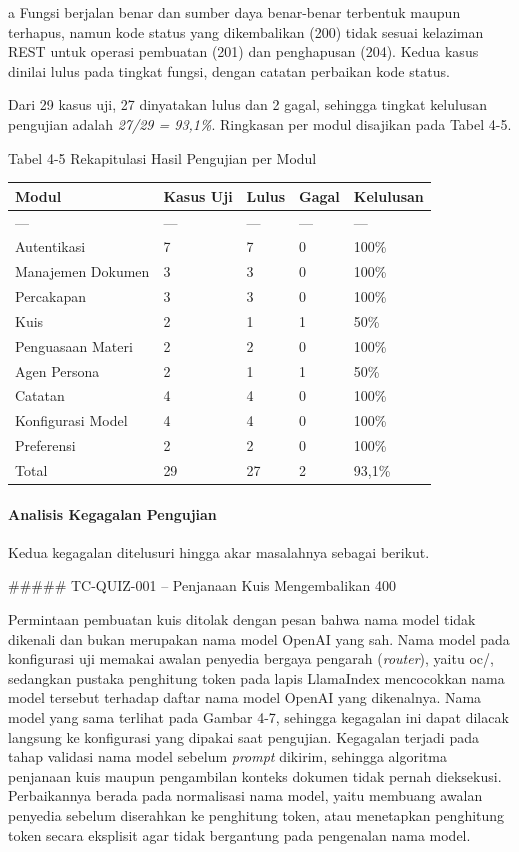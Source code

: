 \documentclass[12pt,a4paper]{article}
\begin{document}
a Fungsi berjalan benar dan sumber daya benar-benar terbentuk maupun terhapus, namun kode status yang dikembalikan (200) tidak sesuai kelaziman REST untuk operasi pembuatan (201) dan penghapusan (204). Kedua kasus dinilai lulus pada tingkat fungsi, dengan catatan perbaikan kode status.

Dari 29 kasus uji, 27 dinyatakan lulus dan 2 gagal, sehingga tingkat kelulusan pengujian adalah \textit{27/29 = 93,1\%}. Ringkasan per modul disajikan pada Tabel 4-5.

Tabel 4-5	Rekapitulasi Hasil Pengujian per Modul

\begin{table}[h]
\centering
\begin{tabular}{lllll}
\toprule
Modul & Kasus Uji & Lulus & Gagal & Kelulusan \\
\midrule
--- & --- & --- & --- & --- \\
Autentikasi & 7 & 7 & 0 & 100\% \\
Manajemen Dokumen & 3 & 3 & 0 & 100\% \\
Percakapan & 3 & 3 & 0 & 100\% \\
Kuis & 2 & 1 & 1 & 50\% \\
Penguasaan Materi & 2 & 2 & 0 & 100\% \\
Agen Persona & 2 & 1 & 1 & 50\% \\
Catatan & 4 & 4 & 0 & 100\% \\
Konfigurasi Model & 4 & 4 & 0 & 100\% \\
Preferensi & 2 & 2 & 0 & 100\% \\
Total & 29 & 27 & 2 & 93,1\% \\
\bottomrule
\end{tabular}
\end{table}
\paragraph*{Analisis Kegagalan Pengujian}
Kedua kegagalan ditelusuri hingga akar masalahnya sebagai berikut.

\#\#\#\#\# TC-QUIZ-001 -- Penjanaan Kuis Mengembalikan 400

Permintaan pembuatan kuis ditolak dengan pesan bahwa nama model tidak dikenali dan bukan merupakan nama model OpenAI yang sah. Nama model pada konfigurasi uji memakai awalan penyedia bergaya pengarah (\textit{router}), yaitu oc/, sedangkan pustaka penghitung token pada lapis LlamaIndex mencocokkan nama model tersebut terhadap daftar nama model OpenAI yang dikenalnya. Nama model yang sama terlihat pada Gambar 4-7, sehingga kegagalan ini dapat dilacak langsung ke konfigurasi yang dipakai saat pengujian. Kegagalan terjadi pada tahap validasi nama model sebelum \textit{prompt} dikirim, sehingga algoritma penjanaan kuis maupun pengambilan konteks dokumen tidak pernah dieksekusi. Perbaikannya berada pada normalisasi nama model, yaitu membuang awalan penyedia sebelum diserahkan ke penghitung token, atau menetapkan penghitung token secara eksplisit agar tidak bergantung pada pengenalan nama model.
\end{document}

